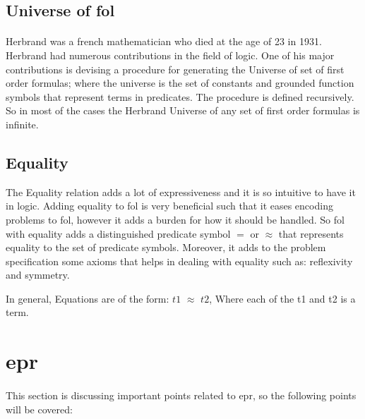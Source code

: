 \subsection{Universe of \ac{fol}}
\paragraph{}
Herbrand was a french mathematician who died at the age of 23 in 1931. Herbrand had numerous contributions in the field of logic. One of his major contributions is devising a procedure for generating the Universe of set of first order formulas; where the universe is the set of constants and grounded function symbols that represent terms in predicates. The procedure is defined recursively. So in most of the cases the Herbrand Universe of any set of first order formulas is infinite.


\subsection{Equality}
The Equality relation adds a lot of expressiveness and it is so intuitive to have it in logic. Adding equality to \ac{fol} is very beneficial such that it eases encoding problems to \ac{fol}, however it adds a burden for how it should be handled. So \ac{fol} with equality adds a distinguished predicate symbol $=$ or $\approx$ that represents equality to the set of predicate symbols. Moreover, it adds to the problem specification some axioms that helps in dealing with equality such as: reflexivity and symmetry.


In general, Equations are of the form: $t1$ $\approx$ $t2$, Where each of the t1 and t2 is a term.


\begin{comment}
One representation of Herbrand Theorem states that:
"Let F be a formula in CNF. The formula F is unsatisfiable iff there is an unsatisfiable set G containing only ground instances of clauses in F."


So this theorem reduces any \ac{fol} problem to an equivalent propositional problem. And this a very important reduction.
\end{comment}




\section{\acf{epr}}\label{sec:c2s2}
\paragraph{} 
This section is discussing important points related to \ac{epr}, so the following points will be covered:

